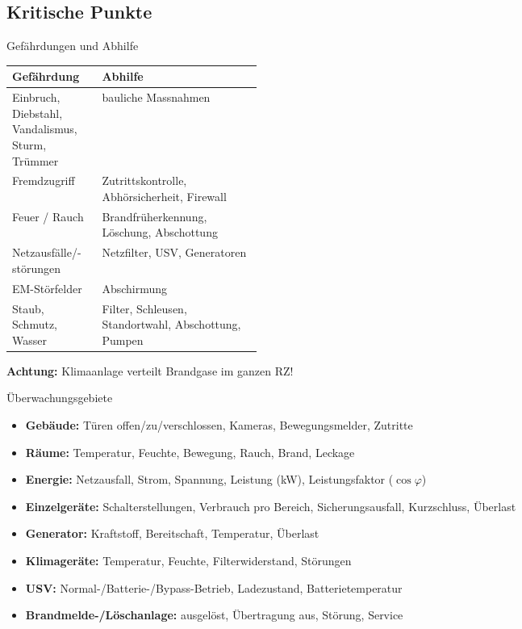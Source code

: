 \documentclass[a4paper, fontsize=7pt]{scrartcl}
\renewcommand*{\arraystretch}{1.5}  %
\begin{document}
\subsection{Kritische Punkte}

\begin{mainbox}{Gefährdungen und Abhilfe}
\renewcommand*{\arraystretch}{1.2}
\begin{tabularx}{\linewidth}{@{}>{\raggedright\arraybackslash}p{0.36\linewidth}|>{\raggedright\arraybackslash}X@{}}
\textbf{Gefährdung} & \textbf{Abhilfe} \\
\hline
Einbruch, Diebstahl, Vandalismus, Sturm, Trümmer & bauliche Massnahmen \\
Fremdzugriff & Zutrittskontrolle, Abhörsicherheit, Firewall \\
Feuer / Rauch & Brandfrüherkennung, Löschung, Abschottung \\
Netzausfälle/-störungen & Netzfilter, USV, Generatoren \\
EM-Störfelder & Abschirmung \\
Staub, Schmutz, Wasser & Filter, Schleusen, Standortwahl, Abschottung, Pumpen \\
\end{tabularx}
\textbf{Achtung:} Klimaanlage verteilt Brandgase im ganzen RZ!
\end{mainbox}

\begin{subbox}{Überwachungsgebiete}
\begin{itemize}
    \item \textbf{Gebäude:} Türen offen/zu/verschlossen, Kameras,
          Bewegungsmelder, Zutritte
    \item \textbf{Räume:} Temperatur, Feuchte, Bewegung, Rauch, Brand, Leckage
    \item \textbf{Energie:} Netzausfall, Strom, Spannung, Leistung (kW),
          Leistungsfaktor ($\cos\varphi$)
    \item \textbf{Einzelgeräte:} Schalterstellungen, Verbrauch pro Bereich,
          Sicherungsausfall, Kurzschluss, Überlast
    \item \textbf{Generator:} Kraftstoff, Bereitschaft, Temperatur, Überlast
    \item \textbf{Klimageräte:} Temperatur, Feuchte, Filterwiderstand, Störungen
    \item \textbf{USV:} Normal-/Batterie-/Bypass-Betrieb, Ladezustand,
          Batterietemperatur
    \item \textbf{Brandmelde-/Löschanlage:} ausgelöst, Übertragung aus,
          Störung, Service
\end{itemize}
\end{subbox}
\end{document}
